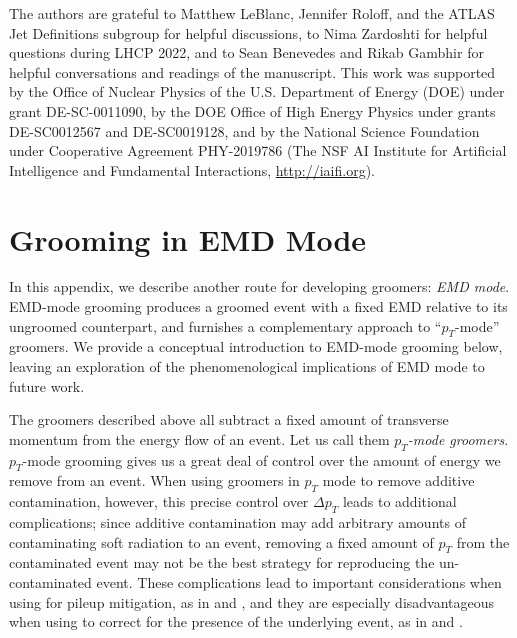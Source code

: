 \documentclass[letterpaper,11pt]{article}
\begin{document}
\acknowledgments

The authors are grateful to Matthew LeBlanc, Jennifer Roloff, and the ATLAS Jet Definitions subgroup for helpful discussions, to Nima Zardoshti for helpful questions during LHCP 2022, and to Sean Benevedes and Rikab Gambhir for helpful conversations and readings of the manuscript.
%
This work was supported by the Office of Nuclear Physics of the U.S. Department of Energy (DOE) under grant DE-SC-0011090, by the DOE Office of High Energy Physics under grants DE-SC0012567 and DE-SC0019128, and by the National Science Foundation under Cooperative Agreement PHY-2019786 (The NSF AI Institute for Artificial Intelligence and Fundamental Interactions, \url{http://iaifi.org}).



\appendix


\section{Grooming in EMD Mode}
\label{app:grooming_in_emd_mode}


In this appendix, we describe another route for developing \PIRANHA{} groomers:
%
\textit{EMD mode}.
%
EMD-mode grooming produces a groomed event with a fixed EMD relative to its ungroomed counterpart, and furnishes a complementary approach to ``\(p_T\)-mode'' groomers.
%
We provide a conceptual introduction to EMD-mode grooming below, leaving an exploration of the phenomenological implications of EMD mode to future work.


The \PIRANHA{} groomers described above all subtract a fixed amount of transverse momentum from the energy flow of an event.
%
Let us call them \textit{\(p_T\)-mode groomers}.
%
\(p_T\)-mode grooming gives us a great deal of control over the amount of energy we remove from an event.
%
When using \PIRANHA{} groomers in \(p_T\) mode to remove additive contamination, however, this precise control over \(\Delta p_T\) leads to additional complications;
%
since additive contamination may add arbitrary amounts of contaminating soft radiation to an event, removing a fixed amount of \(p_T\) from the contaminated event may not be the best strategy for reproducing the un-contaminated event.
%
These complications lead to important considerations when using \PIRANHA{} for pileup mitigation, as in  and , and they are especially disadvantageous when using \PIRANHA{} to correct for the presence of the underlying event, as in  and .
\end{document}
